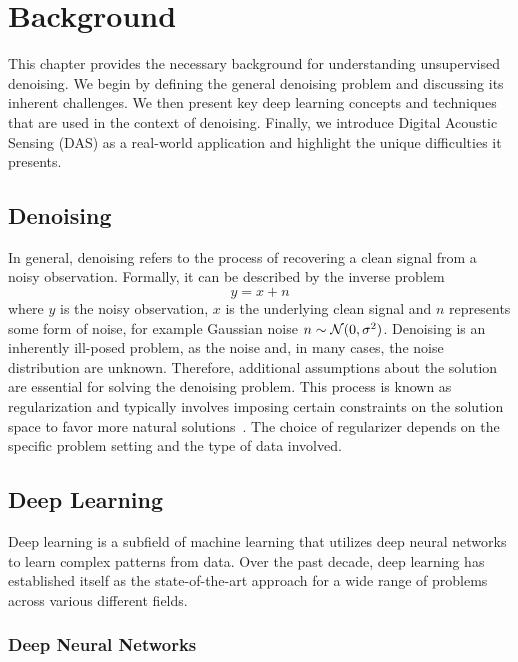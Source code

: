 \chapter{Background}\label{ch:background}

This chapter provides the necessary background for understanding unsupervised denoising. %
We begin by defining the general denoising problem and discussing its inherent challenges.
We then present key deep learning concepts and techniques that are used in the context of denoising.
Finally, we introduce Digital Acoustic Sensing (DAS) as a real-world application and highlight the unique difficulties 
it presents.

\section{Denoising}

In general, denoising refers to the process of recovering a clean signal from a noisy observation.
Formally, it can be described by the inverse problem 
\begin{equation}
    y = x + n
\end{equation}
where $y$ is the noisy observation, $x$ is the underlying clean signal and $n$ represents some form of noise, for
example Gaussian noise $n \sim \mathcal{N}(0,\sigma^2)$.
Denoising is an inherently ill-posed problem, as the noise and, in many cases, the noise distribution are unknown.
Therefore, additional assumptions about the solution are essential for solving the denoising problem. 
This process is known as regularization and typically involves imposing certain constraints on the solution space to 
favor more natural solutions~\cite{XXX}. 
The choice of regularizer depends on the specific problem setting and the type of data involved.

\section{Deep Learning}

Deep learning is a subfield of machine learning that utilizes deep neural networks to learn complex patterns from data. 
Over the past decade, deep learning has established itself as the state-of-the-art approach for a wide range of problems
across various different fields.

\subsection{Deep Neural Networks}


